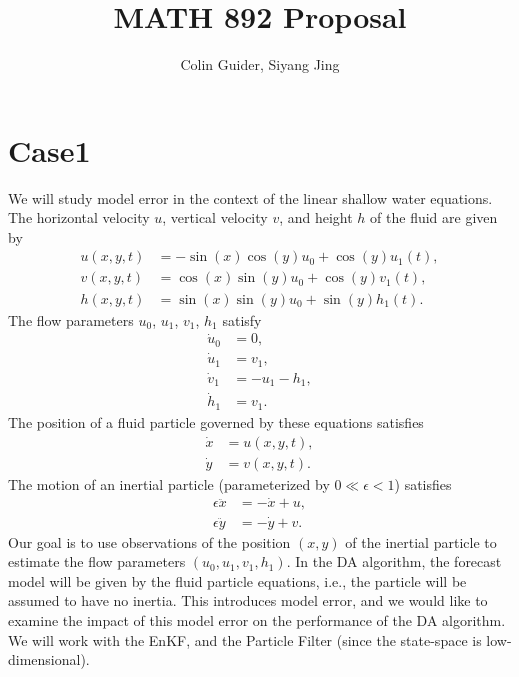 \documentclass{report}
\title{MATH 892 Proposal}
\author{Colin Guider, Siyang Jing}
\begin{document}
\section*{Case1}
We will study model error in the context of the linear shallow water equations.  The horizontal velocity $u$, vertical velocity $v$, and height $h$ of the fluid are given by
\begin{align*}
u(x,y,t) &= -\sin(x)\cos(y)u_0+\cos(y)u_1(t), \\
v(x,y,t) &= \cos(x)\sin(y)u_0+\cos(y)v_1(t), \\
h(x,y,t) &= \sin(x)\sin(y)u_0+\sin(y)h_1(t).
\end{align*}
The flow parameters $u_0$, $u_1$, $v_1$, $h_1$ satisfy
\begin{align*}
\dot{u}_0 &= 0, \\
\dot{u}_1 &= v_1, \\
\dot{v}_1 &= -u_1-h_1, \\
\dot{h}_1 &= v_1.
\end{align*}
The position of a fluid particle governed by these equations satisfies
\begin{align*}
\dot{x} &= u(x,y,t), \\
\dot{y} &= v(x,y,t).
\end{align*}
The motion of an inertial particle (parameterized by $0 \ll \epsilon < 1$) satisfies
\begin{align*}
\epsilon \ddot{x} &= -\dot{x}+u, \\
\epsilon \ddot{y} &= -\dot{y}+v.
\end{align*}
Our goal is to use observations of the position $(x,y)$ of the inertial particle to estimate the flow parameters $(u_0, u_1, v_1, h_1)$.  In the DA algorithm, the forecast model will be given by the fluid particle equations, i.e., the particle will be assumed to have no inertia.  This introduces model error, and we would like to examine the impact of this model error on the performance of the DA algorithm.  We will work with the EnKF, and the Particle Filter (since the state-space is low-dimensional).
\end{document}
